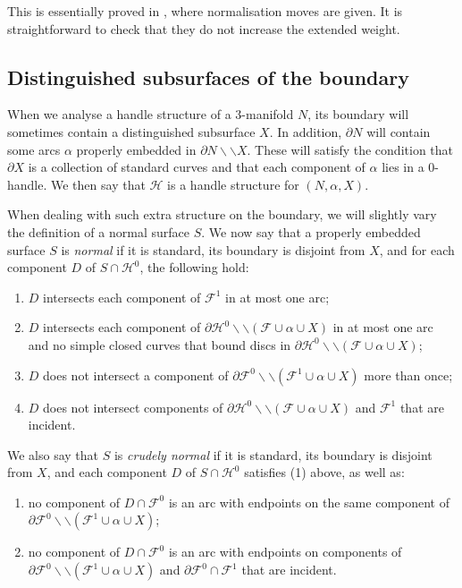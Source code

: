 \documentclass[oneside]{amsart}
\numberwithin{equation}{section}
\theoremstyle{plain}
\theoremstyle{definition}
\newcommand{\cut}{\backslash\backslash}
\newcommand{\calF}{\mathcal{F}}
\begin{document}
This is essentially proved in \cite[Theorem 3.4.7]{Matveev}, where normalisation moves are given. It is straightforward to
check that they do not
increase the extended weight.

\subsection{Distinguished subsurfaces of the boundary}
\label{Subsec:DistinguishedSubsurfaces}

When we analyse a handle structure of a 3-manifold $N$, its boundary will sometimes contain a distinguished
subsurface $X$. In addition, $\partial N$ will contain some arcs $\alpha$ properly embedded in $\partial N \cut X$.
These will satisfy the condition that $\partial X$ is a collection of standard curves and that each component of $\alpha$ lies in a 0-handle. We then
say that $\mathcal{H}$ is a handle structure for $(N,\alpha, X)$.

When dealing with such extra structure on the boundary, we will slightly vary the definition of a normal surface $S$.
We now say that a properly embedded surface $S$ is \emph{normal} if it is standard, its boundary is disjoint from $X$, and
for each component $D$ of $S \cap \mathcal{H}^0$,
the following hold:
\begin{enumerate}
\item $D$ intersects each component of $\mathcal{F}^1$ in at most one arc;
\item $D$ intersects each component of $\partial \mathcal{H}^0 \cut (\mathcal{F} \cup \alpha \cup X)$ in at
most one arc and no simple closed curves that bound discs in $\partial \mathcal{H}^0 \cut (\mathcal{F} \cup \alpha \cup X)$;
\item $D$ does not intersect a component of $\partial \mathcal{F}^0 \cut (\mathcal{F}^1 \cup \alpha \cup X)$
more than once;
\item $D$ does not intersect components of $\partial \mathcal{H}^0 \cut (\mathcal{F} \cup \alpha \cup X)$ and
$\mathcal{F}^1$ that are incident.
\end{enumerate}
We also say that $S$ is \emph{crudely normal} if it is standard, its boundary is disjoint from $X$, and
each component $D$ of $S \cap \mathcal{H}^0$ satisfies (1) 
above, as well as:
\begin{enumerate}
\item[($3'$)] no component of $D \cap \calF^0$ is an arc with endpoints on the same component of
$\partial \mathcal{F}^0 \cut (\mathcal{F}^1 \cup \alpha \cup X)$;
\item[($4'$)] no component of $D \cap \calF^0$ is an arc with endpoints on components of \linebreak $\partial \mathcal{F}^0 \cut (\mathcal{F}^1 \cup \alpha \cup X)$ and
$\partial \mathcal{F}^0 \cap \mathcal{F}^1$ that are incident.
\end{enumerate}
\end{document}
